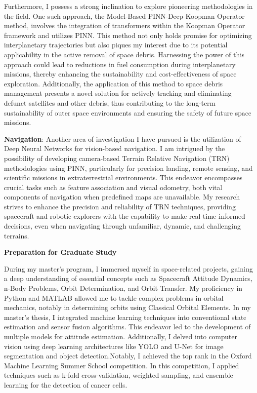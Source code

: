 \documentclass[a4,20pt]{article}
\begin{document}
\begin{large}
Furthermore, I possess a strong inclination to explore pioneering methodologies in the field. One such approach, the Model-Based PINN-Deep Koopman Operator method, involves the integration of transformers within the Koopman Operator framework and utilizes PINN. This method not only holds promise for optimizing interplanetary trajectories but also piques my interest due to its potential applicability in the active removal of space debris. Harnessing the power of this approach could lead to reductions in fuel consumption during interplanetary missions, thereby enhancing the sustainability and cost-effectiveness of space exploration. Additionally, the application of this method to space debris management presents a novel solution for actively tracking and eliminating defunct satellites and other debris, thus contributing to the long-term sustainability of outer space environments and ensuring the safety of future space missions.\vspace{-0.25cm}


\textbf{Navigation}: Another area of investigation I have pursued is the utilization of Deep Neural Networks for vision-based navigation. I am intrigued by the possibility of developing camera-based Terrain Relative Navigation (TRN) methodologies using PINN, particularly for precision landing, remote sensing, and scientific missions in extraterrestrial environments. This endeavor encompasses crucial tasks such as feature association and visual odometry, both vital components of navigation when predefined maps are unavailable. My research strives to enhance the precision and reliability of TRN techniques, providing spacecraft and robotic explorers with the capability to make real-time informed decisions, even when navigating through unfamiliar, dynamic, and challenging terrains.


\textbf{Preparation for Graduate Study} \vspace{-0.35cm}

During my master's program, I immersed myself in space-related projects, gaining a deep understanding of essential concepts such as Spacecraft Attitude Dynamics, n-Body Problems, Orbit Determination, and Orbit Transfer. My proficiency in Python and MATLAB allowed me to tackle complex problems in orbital mechanics, notably in determining orbits using Classical Orbital Elements. In my master's thesis, I integrated machine learning techniques into conventional state estimation and sensor fusion algorithms. This endeavor led to the development of multiple models for attitude estimation. Additionally, I delved into computer vision using deep learning architectures like YOLO and U-Net for image segmentation and object detection.Notably, I achieved the top rank in the Oxford Machine Learning Summer School competition. In this competition, I applied techniques such as k-fold cross-validation, weighted sampling, and ensemble learning for the detection of cancer cells. \vspace{-0.35cm}


\end{large}
\end{document}

